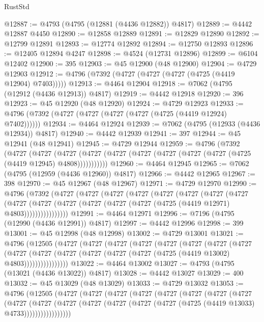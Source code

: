 \begin{lexlean}{RustStd}
\begin{coremodule}
@12887 := @4793 (@4795 (@12881 (@4436 @12882)) @4817)
@12889 := @4442 @12887 @4450
@12890 := @12858 @12889
@12891 := @12829 @12890
@12892 := @12799 @12891
@12893 := @12774 @12892
@12894 := @12750 @12893
@12896 := @12405 @12894 @4247
@12898 := @4524 (@12731 @12896)
@12899 := @6104 @12402
@12900 := 395
@12903 := @45 @12900 (@48 @12900)
@12904 := @4729 @12903
@12912 := @4796 (@7392 (@4727 (@4727 (@4727 (@4725 (@4419 @12904) @7403)))))
@12913 := @4464 @12904
@12918 := @7062 (@4795 (@12912 (@4436 @12913)) @4817)
@12919 := @4442 @12918
@12920 := 396
@12923 := @45 @12920 (@48 @12920)
@12924 := @4729 @12923
@12933 := @4796 (@7392 (@4727 (@4727 (@4727 (@4727 (@4725 (@4419 @12924) @7402))))))
@12934 := @4464 @12924
@12939 := @7062 (@4795 (@12933 (@4436 @12934)) @4817)
@12940 := @4442 @12939
@12941 := 397
@12944 := @45 @12941 (@48 @12941)
@12945 := @4729 @12944
@12959 := @4796
    (@7392
      (@4727
        (@4727
          (@4727 (@4727 (@4727 (@4727 (@4727 (@4727 (@4727 (@4725 (@4419 @12945) @4808)))))))))))
@12960 := @4464 @12945
@12965 := @7062 (@4795 (@12959 (@4436 @12960)) @4817)
@12966 := @4442 @12965
@12967 := 398
@12970 := @45 @12967 (@48 @12967)
@12971 := @4729 @12970
@12990 := @4796
    (@7392
      (@4727
        (@4727
          (@4727
            (@4727
              (@4727
                (@4727
                  (@4727
                    (@4727
                      (@4727
                        (@4727
                          (@4727 (@4727 (@4727 (@4727 (@4725 (@4419 @12971) @4803))))))))))))))))
@12991 := @4464 @12971
@12996 := @7196 (@4795 (@12990 (@4436 @12991)) @4817)
@12997 := @4442 @12996
@12998 := 399
@13001 := @45 @12998 (@48 @12998)
@13002 := @4729 @13001
@13021 := @4796
    (@12505
      (@4727
        (@4727
          (@4727
            (@4727
              (@4727
                (@4727
                  (@4727
                    (@4727
                      (@4727
                        (@4727
                          (@4727 (@4727 (@4727 (@4727 (@4725 (@4419 @13002) @4803))))))))))))))))
@13022 := @4464 @13002
@13027 := @4793 (@4795 (@13021 (@4436 @13022)) @4817)
@13028 := @4442 @13027
@13029 := 400
@13032 := @45 @13029 (@48 @13029)
@13033 := @4729 @13032
@13053 := @4796
    (@12505
      (@4727
        (@4727
          (@4727
            (@4727
              (@4727
                (@4727
                  (@4727
                    (@4727
                      (@4727
                        (@4727
                          (@4727
                            (@4727 (@4727 (@4727 (@4727 (@4725 (@4419 @13033) @4733)))))))))))))))))

\end{coremodule}
\end{lexlean}
